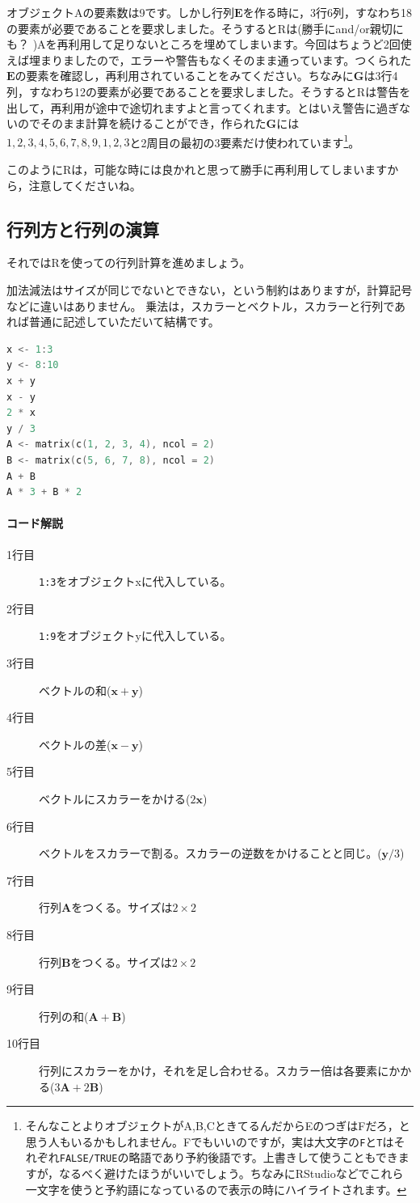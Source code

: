 \documentclass{ltjsbook}
\begin{document}
オブジェクトAの要素数は9です。しかし行列$\bm{E}$を作る時に，3行6列，すなわち18の要素が必要であることを要求しました。そうするとRは(勝手にand/or親切にも？ )Aを再利用して足りないところを埋めてしまいます。今回はちょうど2回使えば埋まりましたので，エラーや警告もなくそのまま通っています。つくられた$\bm{E}$の要素を確認し，再利用されていることをみてください。ちなみに$\bm{G}$は3行4列，すなわち12の要素が必要であることを要求しました。そうするとRは警告を出して，再利用が途中で途切れますよと言ってくれます。とはいえ警告に過ぎないのでそのまま計算を続けることができ，作られた$\bm{G}$には$1,2,3,4,5,6,7,8,9,1,2,3$と2周目の最初の3要素だけ使われています\footnote{そんなことよりオブジェクトがA,B,CときてるんだからEのつぎはFだろ，と思う人もいるかもしれません。Fでもいいのですが，実は大文字の\texttt{F}と\texttt{T}はそれぞれ\texttt{FALSE/TRUE}の略語であり予約後語です。上書きして使うこともできますが，なるべく避けたほうがいいでしょう。ちなみにRStudioなどでこれら一文字を使うと予約語になっているので表示の時にハイライトされます。}。

このようにRは，可能な時には良かれと思って勝手に再利用してしまいますから，注意してくださいね。
\subsection{行列方と行列の演算}
それではRを使っての行列計算を進めましょう。

加法減法はサイズが同じでないとできない，という制約はありますが，計算記号などに違いはありません。
乗法は，スカラーとベクトル，スカラーと行列であれば普通に記述していただいて結構です。

\begin{lstlisting}[language=c++,label={code:09_03},caption={ベクトルの和・差，スカラーをかける}]
x <- 1:3
y <- 8:10
x + y
x - y
2 * x
y / 3
A <- matrix(c(1, 2, 3, 4), ncol = 2)
B <- matrix(c(5, 6, 7, 8), ncol = 2)
A + B
A * 3 + B * 2
\end{lstlisting}
\paragraph{コード解説}
\begin{description}
	\item[1行目] \texttt{1:3}をオブジェクトxに代入している。
	\item[2行目] \texttt{1:9}をオブジェクトyに代入している。
	\item[3行目] ベクトルの和($\bm{x}+\bm{y}$)
	\item[4行目] ベクトルの差($\bm{x}-\bm{y}$)
	\item[5行目] ベクトルにスカラーをかける($2\bm{x}$)
	\item[6行目] ベクトルをスカラーで割る。スカラーの逆数をかけることと同じ。($\bm{y}/3$)
	\item[7行目] 行列$\bm{A}$をつくる。サイズは$2 \times 2$
	\item[8行目] 行列$\bm{B}$をつくる。サイズは$2 \times 2$
	\item[9行目] 行列の和($\bm{A}+\bm{B}$)
	\item[10行目] 行列にスカラーをかけ，それを足し合わせる。スカラー倍は各要素にかかる($3\bm{A}+2\bm{B}$)
\end{description}
\end{document}
